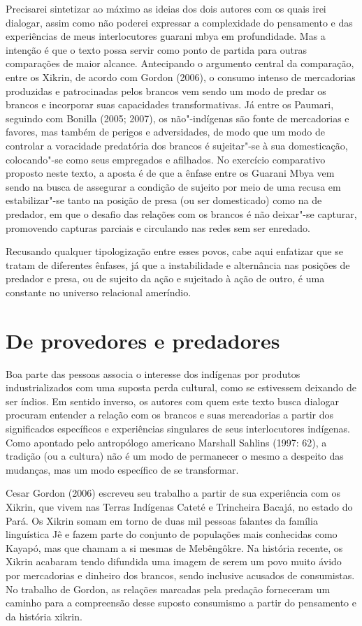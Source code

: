 Precisarei sintetizar ao máximo as ideias dos dois autores com os quais
irei dialogar, assim como não poderei expressar a complexidade do
pensamento e das experiências de meus interlocutores guarani mbya em
profundidade. Mas a intenção é que o texto possa servir como ponto de
partida para outras comparações de maior alcance. Antecipando o
argumento central da comparação, entre os Xikrin, de acordo com Gordon
(2006), o consumo intenso de mercadorias produzidas e patrocinadas
pelos brancos vem sendo um modo de predar os brancos e incorporar suas
capacidades transformativas. Já entre os Paumari, seguindo com Bonilla
(2005; 2007), os não"-indígenas são fonte de mercadorias e favores, mas
também de perigos e adversidades, de modo que um modo de controlar a
voracidade predatória dos brancos é sujeitar"-se à sua domesticação,
colocando"-se como seus empregados e afilhados. No exercício comparativo
proposto neste texto, a aposta é de que a ênfase entre os Guarani Mbya
vem sendo na busca de assegurar a condição de sujeito por meio de uma
recusa em estabilizar"-se tanto na posição de presa (ou ser domesticado)
como na de predador, em que o desafio das relações com os brancos é não
deixar"-se capturar, promovendo capturas parciais e circulando nas redes
sem ser enredado. 

Recusando qualquer tipologização entre esses povos, cabe aqui enfatizar
que se tratam de diferentes ênfases, já que a instabilidade e
alternância nas posições de predador e presa, ou de sujeito da ação e
sujeitado à ação de outro, é uma constante no universo relacional
ameríndio. 

\section{De provedores e predadores} 

Boa parte das pessoas associa o interesse dos indígenas por produtos
industrializados com uma suposta perda cultural, como se estivessem
deixando de ser índios. Em sentido inverso, os autores com quem este
texto busca dialogar procuram entender a relação com os brancos e suas
mercadorias a partir dos significados específicos e experiências
singulares de seus interlocutores indígenas. Como apontado pelo
antropólogo americano Marshall Sahlins (1997: 62), a tradição (ou a
cultura) não é um modo de permanecer o mesmo a despeito das mudanças,
mas um modo específico de se transformar.

Cesar Gordon (2006) escreveu seu trabalho a partir de sua experiência
com os Xikrin, que vivem nas Terras Indígenas Cateté e Trincheira
Bacajá, no estado do Pará. Os Xikrin somam em torno de duas mil pessoas
falantes da família linguística Jê e fazem parte do conjunto de
populações mais conhecidas como Kayapó, mas que chamam a si mesmas de
Mebêngôkre. Na história recente, os Xikrin acabaram tendo difundida uma
imagem de serem um povo muito ávido por mercadorias e dinheiro dos
brancos, sendo inclusive acusados de consumistas. No trabalho de
Gordon, as relações marcadas pela predação forneceram um caminho para a
compreensão desse suposto consumismo a partir do pensamento e da
história xikrin.

